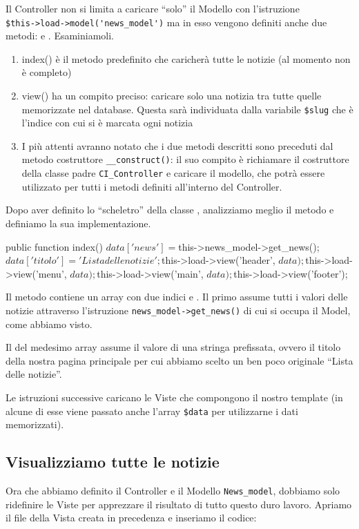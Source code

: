 Il Controller non si limita a caricare ``solo'' il Modello con l'istruzione \\ \verb|$this->load->model('news_model')| ma in esso vengono definiti anche due metodi:  e . Esaminiamoli.

\begin{enumerate}
\item index() è il metodo predefinito che caricherà tutte le notizie (al momento non è completo)
\item view() ha un compito preciso: caricare solo una notizia tra tutte quelle memorizzate nel database. Questa sarà individuata dalla variabile \verb|$slug| che è l'indice con cui si è marcata ogni notizia
\item I più attenti avranno notato che i due metodi descritti sono preceduti dal metodo costruttore \verb|__construct()|: il suo compito è richiamare il costruttore della classe padre \verb|CI_Controller| e caricare il modello, che potrà essere utilizzato per tutti i metodi definiti all'interno del Controller.
\end{enumerate}

Dopo aver definito lo ``scheletro'' della classe , analizziamo meglio il metodo  e definiamo la sua implementazione.

\begin{code}
public function index()
{
	$data['news'] = $this->news_model->get_news();
	$data['titolo'] = 'Lista delle notizie';

	$this->load->view('header', $data);
	$this->load->view('menu', $data);
	$this->load->view('main', $data);
	$this->load->view('footer');
}
\end{code}

Il metodo contiene un array  con due indici  e . Il primo assume tutti i valori delle notizie attraverso l'istruzione \verb|news_model->get_news()| di cui si occupa il Model, come abbiamo visto.

Il  del medesimo array assume il valore di una stringa prefissata, ovvero il titolo della nostra pagina principale per cui abbiamo scelto un ben poco originale ``Lista delle notizie''.

Le istruzioni successive caricano le Viste che compongono il nostro template (in alcune di esse viene passato anche l'array \verb|$data| per utilizzarne i dati memorizzati).

\subsection{Visualizziamo tutte le notizie}
Ora che abbiamo definito il Controller e il Modello \verb|News_model|, dobbiamo solo ridefinire le Viste per apprezzare il risultato di tutto questo duro lavoro. Apriamo il file della Vista creata in precedenza  e inseriamo il codice:

